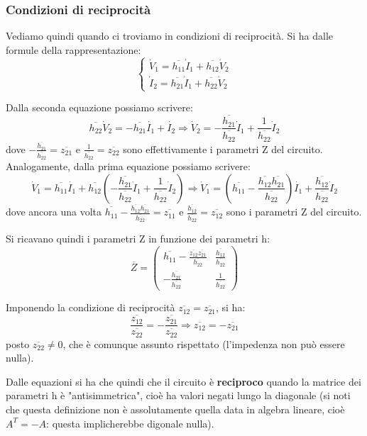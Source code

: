 \documentclass[a4paper,11pt]{article}
\begin{document}
\subsubsection{Condizioni di reciprocità}
Vediamo quindi quando ci troviamo in condizioni di reciprocità.
Si ha dalle formule della rappresentazione:
\[
	\begin{cases}
		\dot{V}_1 = \overline{h_{11}} \dot{I}_1 + \overline{h_{12}} \dot{V}_2 \\ 
		\dot{I}_2 = \overline{h_{21}} \dot{I}_1 + \overline{h_{22}} \dot{V}_2
	\end{cases}
\]

Dalla seconda equazione possiamo scrivere:
$$
\overline{h_{22}} \dot{V}_2 = - \overline{h_{21}} \dot{I_1} + \dot{I_2} \Rightarrow \dot{V}_2 = -\frac{\overline{h_{21}}}{\overline{h_{22}}} \dot{I}_1 + \frac{1}{\overline{h_{22}}} \dot{I}_2 
$$
dove $-\frac{\overline{h_{21}}}{\overline{h_{22}}} = \overline{z_{21}}$ e $\frac{1}{\overline{h_{22}}} = \overline{z_{22}}$ sono effettivamente i parametri Z del circuito.
Analogamente, dalla prima equazione possiamo scrivere:
$$
\dot{V}_1 = \overline{h_{11}} \dot{I_1} + \overline{h_{12}} \left(  -\frac{\overline{h_{21}}}{\overline{h_{22}}} \dot{I}_1 + \frac{1}{\overline{h_{22}}} \dot{I}_2  \right) \Rightarrow \dot{V}_1 = \left( \overline{h_{11}} - \frac{\overline{h_{12}}\overline{h_{21}}}{\overline{h_{22}}} \right) \dot{I_1} + \frac{\overline{h_{12}}}{\overline{h_{22}}} \dot{I}_2 
$$
dove ancora una volta $\overline{h_{11}} - \frac{\overline{h_{12}}\overline{h_{21}}}{\overline{h_{22}}} = \overline{z_{11}}$ e $\frac{\overline{h_{12}}}{\overline{h_{22}}} = \overline{z_{12}}$ sono i parametri Z del circuito. 

Si ricavano quindi i parametri Z in funzione dei parametri h:
$$
\overline{Z} =
\begin{pmatrix}
	\overline{h_{11}} - \frac{\overline{z_{12}}\overline{z_{21}}}{\overline{h_{22}}} & \frac{\overline{h_{12}}}{\overline{h_{22}}} \\ 
	- \frac{\overline{h_{21}}}{\overline{h_{22}}} & \frac{1}{\overline{h_{22}}}
\end{pmatrix}
$$

Imponendo la condizione di reciprocità $\overline{z_{12}} = \overline{z_{21}}$, si ha:
$$
\frac{\overline{z_{12}}}{\overline{z_{22}}} = -\frac{\overline{z_{21}}}{\overline{z_{22}}} \Rightarrow \overline{z_{12}} = - \overline{z_{21}}
$$
posto $\overline{z_{22}} \neq 0$, che è comunque assunto rispettato (l'impedenza non può essere nulla).

Dalle equazioni si ha che quindi che il circuito è \textbf{reciproco} quando la matrice dei parametri h è "antisimmetrica", cioè ha valori negati lungo la diagonale (si noti che questa definizione non è assolutamente quella data in algebra lineare, cioè $A^T= -A$: questa implicherebbe digonale nulla). 
\end{document}
